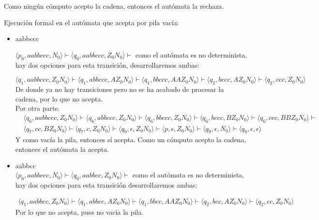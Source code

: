 \documentclass{article}
\begin{document}
\begin{enumerate}
{\begin{enumerate}
{\begin{itemize}
{        		Como ningún cómputo acepto la cadena, entonces el autómata la rechaza.
        		}
			\end{itemize}
			
			Ejecución formal en el autómata que acepta por pila vacía:
        	\begin{itemize}
        		\item {
				aabbccc
				
				$\langle p_0, aabbccc, N_0 \rangle \vdash \langle q_0, aabbccc, 
				Z_0N_0 \rangle \vdash$
				como el autómata es no determinista, hay dos opciones para esta transición, 
				desarrollaremos ambas:
        		
        		\[
					\langle q_1, aabbccc, Z_0N_0 \rangle \vdash 
					\langle q_1, abbccc, AZ_0N_0 \rangle \vdash 
					\langle q_1, bbccc, AAZ_0N_0 \rangle \vdash  
					\langle q_2, bccc, AZ_0N_0 \rangle \vdash 
					\langle q_2, ccc, Z_0N_0 \rangle
				\]
				De donde ya no hay transiciones pero no se ha acabado de
				procesar la cadena, por lo que no acepta.\\
				Por otra parte.
        		\begin{align*}
					&\langle q_6, aabbccc, Z_0N_0 \rangle \vdash
					\langle q_6, abbccc, Z_0N_0 \rangle \vdash
					\langle q_6, bbccc, Z_0N_0 \rangle \vdash
					\langle q_6, bccc, BZ_0N_0 \rangle \vdash
					\langle q_6, ccc, BBZ_0N_0 \rangle \vdash \\
					&\langle q_7, cc, BZ_0N_0 \rangle \vdash
					\langle q_7, c, Z_0N_0 \rangle \vdash
					\langle q_9, \epsilon, Z_0N_0 \rangle \vdash
					\langle p, \epsilon, Z_0N_0 \rangle \vdash
					\langle q_9, \epsilon, N_0 \rangle \vdash
					\langle q_9, \epsilon, \epsilon \rangle
				\end{align*}
				Y como vacía la pila, entonces sí acepta.
        		Como un cómputo acepto la cadena, entonces el autómata la acepta.
        		}
        		\item {
        		aabbcc \\
				$\langle p_0, aabbccc, N_0 \rangle \vdash \langle q_0, aabbcc, 
				Z_0N_0 \rangle \vdash$ como el autómata es no
				determinista, hay dos opciones para esta transición
				desarrollaremos ambas:

				\begin{align*}
					\langle q_1, aabbcc, Z_0N_0 \rangle \vdash 
					\langle q_1, abbcc, AZ_0N_0 \rangle \vdash 
					\langle q_1, bbcc, AAZ_0N_0 \rangle \vdash 
					\langle q_2, bcc, AZ_0N_0 \rangle \vdash 
					\langle q_2, cc, Z_0N_0 \rangle
				\end{align*}
				Por lo que no acepta, pues no vacía la pila.

}
\end{itemize}}
\end{enumerate}}
\end{enumerate}
\end{document}
